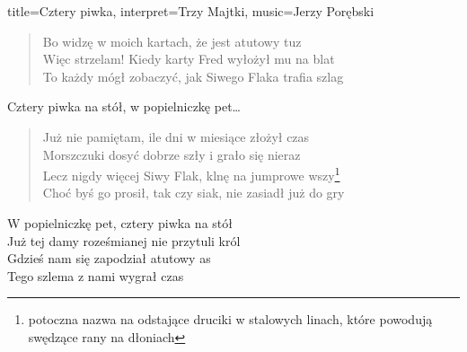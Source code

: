 \begin{song}{title={Cztery piwka}, interpret={Trzy Majtki}, music={Jerzy Porębski}}
\begin{verse}
        Bo widzę w moich kartach, że jest atutowy tuz \\
        Więc strzelam! Kiedy karty Fred wyłożył mu na blat \\
        To każdy mógł zobaczyć, jak Siwego Flaka trafia szlag
    \end{verse}
    \begin{chorus}
        Cztery piwka na stół, w popielniczkę pet\ldots
    \end{chorus}
    \begin{verse}
        Już nie pamiętam, ile dni w miesiące złożył czas \\
        Morszczuki dosyć dobrze szły i grało się nieraz \\
        Lecz nigdy więcej Siwy Flak, klnę na jumprowe wszy\footnote{potoczna nazwa na odstające druciki w stalowych linach, które powodują swędzące rany na dłoniach} \\
        Choć byś go prosił, tak czy siak, nie zasiadł już do gry
    \end{verse}
    \begin{chorus}
        W popielniczkę pet, cztery piwka na stół \\
        Już tej damy roześmianej nie przytuli król \\
        Gdzieś nam się zapodział atutowy as \\
        Tego szlema z nami wygrał czas
    \end{chorus}
\end{song}

